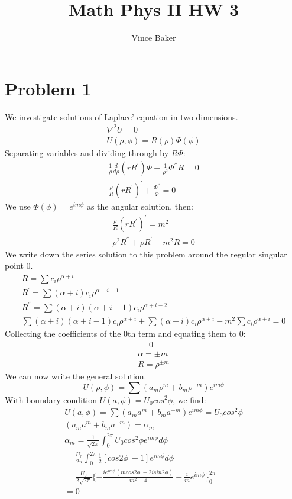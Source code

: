 \documentclass[a4paper,10pt]{article}
\title{Math Phys II HW 3}
\author{Vince Baker}
\numberwithin{equation}{section}
\begin{document}
\maketitle

\begin{abstract}

\end{abstract}

\section{Problem 1}
We investigate solutions of Laplace' equation in two dimensions.
\begin{gather}
 \nabla ^2 U = 0\\
 U(\rho, \phi)=R(\rho)\Phi(\phi)
\end{gather}
Separating variables and dividing through by $R\Phi$:
\begin{gather}
  \frac{1}{\rho}\frac{d}{d\rho}(r R^{'} )\Phi+\frac{1}{\rho^2}\Phi^{''}R=0\\
  \frac{\rho}{R}(rR^{'})^{'}+\frac{\Phi^{''}}{\Phi}=0
\end{gather}
We use $\Phi(\phi)=e^{im\phi}$ as the angular solution, then:
\begin{gather}
 \frac{\rho}{R}(rR^{'})^{'}=m^2\\
 \rho ^2R^{''}+\rho R^{'}-m^2R=0
\end{gather}
We write down the series solution to this problem around the regular singular point 0.
\begin{gather}
 R=\sum c_i \rho ^{\alpha+i}\\
 R^{'}=\sum (\alpha+i)c_i \rho ^{\alpha+i-1}\\
 R^{''}=\sum (\alpha+i)(\alpha+i-1)c_i\rho ^{\alpha+i-2}\\
 \sum (\alpha+i)(\alpha+i-1)c_i\rho ^{\alpha+i}+\sum (\alpha+i)c_i \rho ^{\alpha+i}-m^2\sum c_i \rho ^{\alpha+i}=0
\end{gather}
Collecting the coefficients of the 0th term and equating them to 0:
\begin{gather}
 [\alpha(\alpha-1)+\alpha-m^2]=0\\
 \alpha=\pm m\\
 R=\rho ^{\pm m}
\end{gather}
We can now write the general solution.
\begin{equation}
 U(\rho, \phi)=\sum (a_{m}\rho^{m}+b_m\rho^{-m})e^{im\phi}
\end{equation}
With boundary condition $U(a,\phi)=U_0cos^2\phi$, we find:
\begin{gather}
  U(a, \phi)=\sum (a_{m}a^{m}+b_ma^{-m})e^{im\phi}=U_0cos^2\phi\\
  (a_{m}a^{m}+b_ma^{-m})=\alpha_m\\
  \alpha_m=\frac{1}{\sqrt{2\pi}}\int_0^{2\pi}U_0cos^2\phi e^{im\phi} d\phi\\
  =\frac{U_0}{2\pi}\int_0^{2\pi}\frac{1}{2}[cos2\phi\ +1]e^{im\phi} d\phi\\
  =\frac{U_0}{2\sqrt{2\pi}}\{-\frac{ie^{im\phi}(mcos2\phi\ -2isin2\phi)}{m^2-4}-\frac{i}{m}e^{im\phi} \}_0^{2\pi}\\
  =0
\end{gather}
\end{document}

